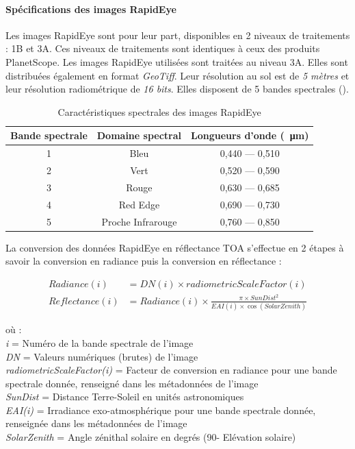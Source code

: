   \paragraph{Spécifications des images RapidEye}

Les images RapidEye sont pour leur part, disponibles en 2 niveaux de traitements : 1B et 3A. Ces niveaux de traitements sont identiques à ceux des produits PlanetScope. Les images
RapidEye utilisées sont traitées au niveau 3A. Elles sont distribuées également en format \emph{GeoTiff}. Leur résolution au sol est de \emph{5 mètres} et leur résolution 
radiométrique de \emph{16 bits}. Elles disposent de 5 bandes spectrales ().

\begin{table}[htbp]
\begin{center}
\caption{Caractéristiques spectrales des images RapidEye}
\label{tab-rapideye}
 \begin{tabular}{ccc}
  \hline
  Bande spectrale & Domaine spectral & Longueurs d'onde (\SI{}{\micro\meter})\\
  \hline
  1 & Bleu & 0,440 --- 0,510 \\
  2 & Vert & 0,520 --- 0,590 \\
  3 & Rouge & 0,630 --- 0,685 \\
  4 & Red Edge & 0,690 --- 0,730 \\ 
  5 & Proche Infrarouge & 0,760 --- 0,850 \\
  \hline
 \end{tabular}
\end{center}
\end{table}

La conversion des données RapidEye en réflectance TOA s'effectue en 2 étapes à savoir la conversion en radiance puis la conversion en réflectance :

\begin{align} Radiance (i) &=   DN(i) \times radiometricScaleFactor(i) \\
Reflectance(i) &=   Radiance(i) \times \frac{\pi \times SunDist^2}{EAI(i) \times \cos(SolarZenith)} 
\end{align}

où :\\
\emph{i} = Numéro de la bande spectrale de l'image \\
\emph{DN} = Valeurs numériques (brutes) de l'image \\
\emph{radiometricScaleFactor(i)} = Facteur de conversion en radiance pour une bande spectrale donnée, renseigné dans les métadonnées de l'image \\
\emph{SunDist} = Distance Terre-Soleil en unités astronomiques \\
\emph{EAI(i)} = Irradiance exo-atmosphérique pour une bande spectrale donnée, renseignée dans les métadonnées de l'image \\
\emph{SolarZenith} = Angle zénithal solaire en degrés (90\textdegree - Elévation solaire)

